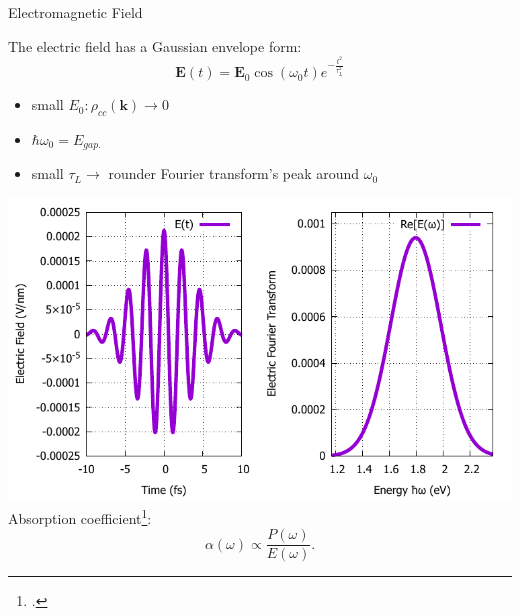 \documentclass{beamer}
\begin{document}
	\begin{frame}{Electromagnetic Field}
	\begin{multicols}{2}
The electric field has a Gaussian envelope form:
\begin{equation}
	\textbf{E}(t) = \textbf{E}_0 \cos(\omega_0 t)e^{-\frac{t^2}{\tau_L^2}}
\end{equation}
\begin{itemize}
	\item small $E_0: \rho_{cc}(\textbf{k}) \to 0$
	\item $\hbar \omega_0 = E_{gap.}$
	\item small $\tau_L \to $ rounder Fourier transform's peak around $\omega_0$
\end{itemize}
\columnbreak
\includegraphics[width=1\linewidth]{images/Eat.pdf}
Absorption coefficient\footcite{haug_quantum_2009}:
\begin{equation}
	\alpha(\omega) \propto \frac{P(\omega)}{E(\omega)}.
\end{equation}
	\end{multicols}
	\end{frame}
\end{document}
